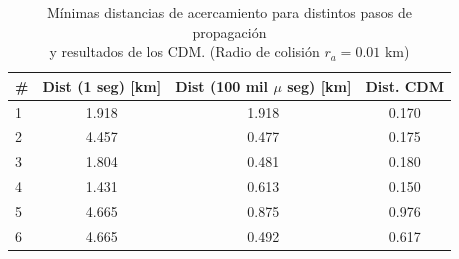 \begin{table}[!h]
 \caption{ARxCODE a partir de los CDM \\ Propagaciones cada 100.000 microsegundos - (Radio de colisi\'on $r_{a}=0.01$ km) - M\'etodo de c\'alculo de PoC: Lei-Chen}
\centering
 \label{tab:cdmsproc100mseg}
 \end{table}

 \begin{table}[!h]
 \caption{M\'inimas distancias de acercamiento para distintos pasos de propagaci\'on \\ y resultados de los CDM. (Radio de colisi\'on $r_{a}=0.01$ km)}
\label{tab:cdmsMinD}
\begin{tabular}{lccc}
 \hline \hline
  \rowcolor{lightgray}
 \# & Dist (1 seg) [km] & Dist (100 mil $\mu$ seg) [km] & Dist. CDM\\
 \hline \hline
 1 & 1.918 &  1.918&  0.170 \\
 
 2 & 4.457 & 0.477 & 0.175  \\

 3 & 1.804 & 0.481 & 0.180\\
 
 4 & 1.431 & 0.613 & 0.150\\
 
 5 & 4.665 & 0.875 & 0.976 \\
 
 6 & 4.665 & 0.492 & 0.617\\
 \hline
\end{tabular} 
\end{table}

